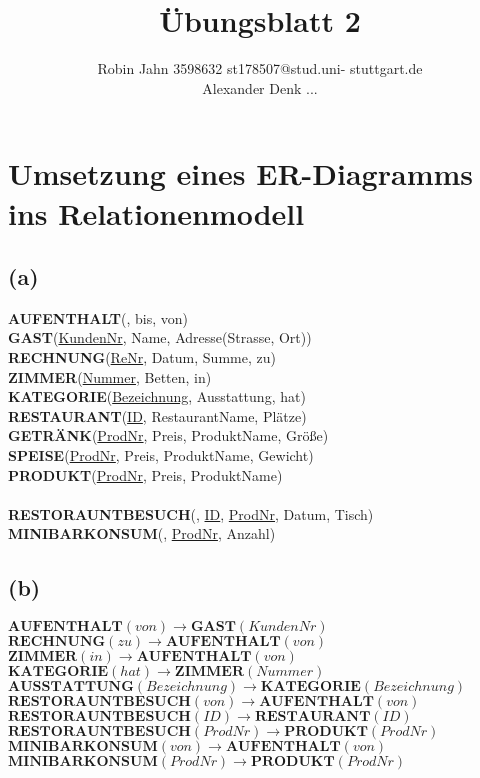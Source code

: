 \documentclass{article}
\title{Übungsblatt 2}
\author{Robin Jahn 3598632 st178507@stud.uni-
stuttgart.de \\
Alexander Denk ... }
\begin{document}
\section{Umsetzung eines ER-Diagramms ins Relationenmodell}

\subsection{(a)}
\textbf{AUFENTHALT}(, bis, von) \\
\textbf{GAST}(\underline{KundenNr}, Name, Adresse(Strasse, Ort)) \\ 
\textbf{RECHNUNG}(\underline{ReNr}, Datum, Summe, zu)\\
\textbf{ZIMMER}(\underline{Nummer}, Betten, in)\\
\textbf{KATEGORIE}(\underline{Bezeichnung}, {Ausstattung}, hat)\\
\textbf{RESTAURANT}(\underline{ID}, RestaurantName, Plätze)\\
\textbf{GETRÄNK}(\underline{ProdNr}, Preis, ProduktName, Größe)\\
\textbf{SPEISE}(\underline{ProdNr}, Preis, ProduktName, Gewicht)\\
\textbf{PRODUKT}(\underline{ProdNr}, Preis, ProduktName)\\ \\
\textbf{RESTORAUNTBESUCH}(, \underline{ID}, \underline{ProdNr}, Datum, Tisch)\\
\textbf{MINIBARKONSUM}(, \underline{ProdNr}, Anzahl)\\    
    

\subsection{(b)}
$\textbf{AUFENTHALT}(von) \rightarrow \textbf{GAST}(KundenNr)$\\
$\textbf{RECHNUNG}(zu) \rightarrow \textbf{AUFENTHALT}(von)$\\
$\textbf{ZIMMER}(in) \rightarrow \textbf{AUFENTHALT}(von)$\\
$\textbf{KATEGORIE}(hat) \rightarrow \textbf{ZIMMER}(Nummer)$\\
$\textbf{AUSSTATTUNG}(Bezeichnung) \rightarrow \textbf{KATEGORIE}(Bezeichnung)$\\
$\textbf{RESTORAUNTBESUCH}(von) \rightarrow \textbf{AUFENTHALT}(von)$\\
$\textbf{RESTORAUNTBESUCH}(ID) \rightarrow \textbf{RESTAURANT}(ID)$\\
$\textbf{RESTORAUNTBESUCH}(ProdNr) \rightarrow \textbf{PRODUKT}(ProdNr)$\\
$\textbf{MINIBARKONSUM}(von) \rightarrow \textbf{AUFENTHALT}(von)$\\
$\textbf{MINIBARKONSUM}(ProdNr) \rightarrow \textbf{PRODUKT}(ProdNr)$\\
\end{document}
